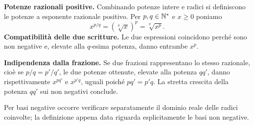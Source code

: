 \begin{schema}
\hspace{.9cm}
\end{schema}

\textbf{Potenze razionali positive.} Combinando potenze intere e radici si definiscono le potenze a esponente razionale positivo. Per $p,q\in\mathbb{N}^*$ e $x\ge0$ poniamo
\[
x^{p/q}=(\sqrt[q]{x})^p=\sqrt[q]{x^p}.
\]
\textbf{Compatibilità delle due scritture.} Le due espressioni coincidono perché sono non negative e, elevate alla $q$-esima potenza, danno entrambe $x^p$.

\textbf{Indipendenza dalla frazione.} Se due frazioni rappresentano lo stesso razionale, cioè se $p/q=p'/q'$, le due potenze ottenute, elevate alla potenza $qq'$, danno rispettivamente $x^{pq'}$ e $x^{p'q}$, uguali poiché $pq'=p'q$. La stretta crescita della potenza $qq'$ sui non negativi conclude.

Per basi negative occorre verificare separatamente il dominio reale delle radici coinvolte; la definizione appena data riguarda esplicitamente le basi non negative.
